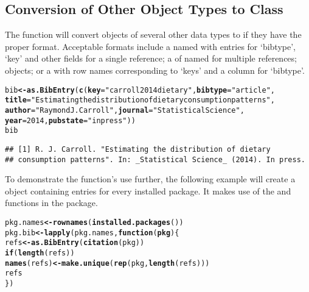 \documentclass[article]{jss}\usepackage[]{graphicx}\usepackage[]{color}
\makeatletter
\newcommand{\hlnum}[1]{\textcolor[rgb]{0.125,0.125,1}{#1}}%
\newcommand{\hlstr}[1]{\textcolor[rgb]{0.125,0.125,1}{#1}}%
\newcommand{\hlstd}[1]{\textcolor[rgb]{0.251,0.251,0.282}{#1}}%
\newcommand{\hlkwa}[1]{\textcolor[rgb]{0,0.533,0.345}{\textbf{#1}}}%
\newcommand{\hlkwb}[1]{\textcolor[rgb]{0.439,0.251,1}{\textbf{#1}}}%
\newcommand{\hlkwc}[1]{\textcolor[rgb]{0.529,0,0.184}{\textbf{#1}}}%
\newcommand{\hlkwd}[1]{\textcolor[rgb]{0.251,0.251,0.282}{\textbf{#1}}}%
\newenvironment{kframe}{%
 \def\at@end@of@kframe{}%
 \ifinner\ifhmode%
  \def\at@end@of@kframe{\end{minipage}}%
  \begin{minipage}{\columnwidth}%
 \fi\fi%
 \def\FrameCommand##1{\hskip\@totalleftmargin \hskip-\fboxsep
 \colorbox{shadecolor}{##1}\hskip-\fboxsep
     \hskip-\linewidth \hskip-\@totalleftmargin \hskip\columnwidth}%
 \MakeFramed {\advance\hsize-\width
   \@totalleftmargin\z@ \linewidth\hsize
   \@setminipage}}%
 {\par\unskip\endMakeFramed%
 \at@end@of@kframe}
\newenvironment{knitrout}{}{} %
\makeatother
\begin{document}
\subsection[Conversion of Other Object Types to Class BibEntry]{Conversion of Other Object Types to Class }
The  function will convert objects of several other data types to  if they have the proper format.  Acceptable formats include a named  with entries for `bibtype', `key' and other fields for a single reference; a  of named  for multiple references;  objects; or a  with row names corresponding to `keys' and a column for `bibtype'.
\begin{knitrout}
\color{fgcolor}\begin{kframe}
\begin{alltt}
\hlstd{bib} \hlkwb{<-} \hlkwd{as.BibEntry}\hlstd{(}\hlkwd{c}\hlstd{(}\hlkwc{key} \hlstd{=} \hlstr{"carroll2014dietary"}\hlstd{,} \hlkwc{bibtype} \hlstd{=} \hlstr{"article"}\hlstd{,}
  \hlkwc{title} \hlstd{=} \hlstr{"Estimating the distribution of dietary consumption patterns"}\hlstd{,}
  \hlkwc{author} \hlstd{=} \hlstr{"Raymond J. Carroll"}\hlstd{,} \hlkwc{journal} \hlstd{=} \hlstr{"Statistical Science"}\hlstd{,}
  \hlkwc{year} \hlstd{=} \hlnum{2014}\hlstd{,} \hlkwc{pubstate} \hlstd{=} \hlstr{"inpress"}\hlstd{))}
\hlstd{bib}
\end{alltt}
\begin{verbatim}
## [1] R. J. Carroll. "Estimating the distribution of dietary
## consumption patterns". In: _Statistical Science_ (2014). In press.
\end{verbatim}
\end{kframe}
\end{knitrout}


To demonstrate the function's use further, the following example will create a  object containing entries for every installed \R{} package.  It makes use of the  and  functions in the  package.
\begin{knitrout}
\color{fgcolor}\begin{kframe}
\begin{alltt}
\hlstd{pkg.names} \hlkwb{<-} \hlkwd{rownames}\hlstd{(}\hlkwd{installed.packages}\hlstd{())}
\hlstd{pkg.bib} \hlkwb{<-} \hlkwd{lapply}\hlstd{(pkg.names,} \hlkwa{function}\hlstd{(}\hlkwc{pkg}\hlstd{)\{}
  \hlstd{refs} \hlkwb{<-} \hlkwd{as.BibEntry}\hlstd{(}\hlkwd{citation}\hlstd{(pkg))}
  \hlkwa{if} \hlstd{(}\hlkwd{length}\hlstd{(refs))}
    \hlkwd{names}\hlstd{(refs)} \hlkwb{<-} \hlkwd{make.unique}\hlstd{(}\hlkwd{rep}\hlstd{(pkg,} \hlkwd{length}\hlstd{(refs)))}
  \hlstd{refs}
\hlstd{\})}
\end{alltt}
\end{kframe}
\end{knitrout}
\end{document}
